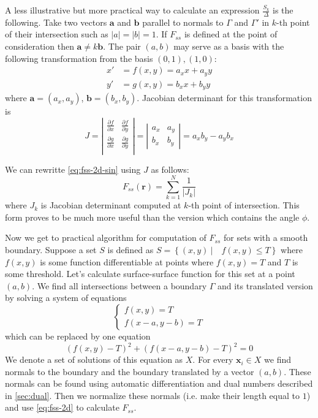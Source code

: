 \documentclass[reprint,amsmath,amssymb,aps,pre,showkeys,showpacs]{revtex4-1}
\begin{document}
A less illustrative but more practical way to calculate an expression
$\frac{S_k}{\Delta}$ is the following. Take two vectors $\bm{a}$ and $\bm{b}$
parallel to normals to $\Gamma$ and $\Gamma'$ in $k$-th point of their
intersection such as $|a| = |b| = 1$. If $F_{ss}$ is defined at the point of
consideration then $\bm{a} \ne k\bm{b}$. The pair $(a, b)$ may serve as a basis
with the following transformation from the basis $(0,1), (1,0)$:
\begin{align*}
  x' &= f(x, y) = a_x x + a_y y \\
  y' &= g(x, y) = b_x x + b_y y
\end{align*}
where $\bm{a} = (a_x, a_y)$, $\bm{b} = (b_x, b_y)$. Jacobian determinant for
this transformation is
\begin{equation*}
  J = \left|
  \begin{array}{cc}
    \frac{\partial f}{\partial x} & \frac{\partial f}{\partial y} \\
    \frac{\partial g}{\partial x} & \frac{\partial g}{\partial y} \\
  \end{array}
  \right| =
  \left|
  \begin{array}{cc}
    a_x & a_y \\
    b_x & b_y
  \end{array}
  \right| = a_x b_y - a_y b_x
\end{equation*}

We can rewritte \cref{eq:fss-2d-sin} using $J$ as follows:
\begin{equation}
  F_{ss}(\bm{r}) = \sum_{k=1}^N \frac{1}{|J_k|} \label{eq:fss-2d}
\end{equation}
where $J_k$ is Jacobian determinant computed at $k$-th point of
intersection. This form proves to be much more useful than the version which
contains the angle $\phi$.

Now we get to practical algorithm for computation of $F_{ss}$ for sets with a
smooth boundary. Suppose a set $S$ is defined as
$S = \left\{ (x, y) \ | \quad f(x, y) \le T \right\}$ where $f(x, y)$ is some
function differentiable at points where $f(x, y) = T$ and $T$ is some
threshold. Let's calculate surface-surface function for this set at a point
$(a, b)$. We find all intersections between a boundary $\Gamma$ and its
translated version by solving a system of equations
\begin{equation*}
  \left\{
  \begin{array}{l}
    f(x, y) = T \\
    f(x-a, y-b) = T    
  \end{array}
  \right.
\end{equation*}
which can be replaced by one equation
\begin{equation}
  (f(x, y) - T)^2 + (f(x-a, y-b) - T)^2 = 0 \label{eq:inter}
\end{equation}
We denote a set of solutions of this equation as $X$. For every $\bm{x}_i \in X$
we find normals to the boundary and the boundary translated by a vector
$(a, b)$. These normals can be found using automatic differentiation and dual
numbers described in \cref{sec:dual}. Then we normalize these normals (i.e. make
their length equal to $1$) and use \cref{eq:fss-2d} to calculate $F_{ss}$.
\end{document}

